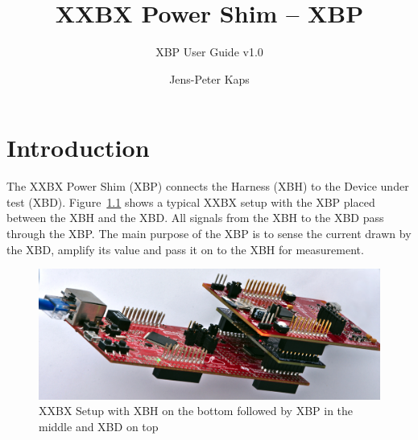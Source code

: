 \documentclass[twoside,11pt]{cergdoc}
\begin{document}


\title{XXBX Power Shim -- XBP}
\subtitle{XBP User Guide v1.0}
\author{Jens-Peter Kaps}

\maketitle

\tableofcontents

\chapter{Introduction}
The XXBX Power Shim (XBP) connects the Harness (XBH) to the Device under test (XBD). Figure~\ref{fig:xxbxsetup}
shows a typical XXBX setup with the XBP placed between the XBH and the XBD. All signals from the 
XBH to the XBD pass through the XBP. The main purpose of the XBP is to sense the current 
drawn by the XBD, amplify its value and pass it on to the XBH for measurement. 

\begin{figure}[ht]
  \begin{center}
    \includegraphics[scale=1]{figures/xxbx-side}
    \caption{XXBX Setup with XBH on the bottom followed by XBP in the middle and XBD on top}\label{fig:xxbxsetup}
  \end{center}
\end{figure}
\end{document}
